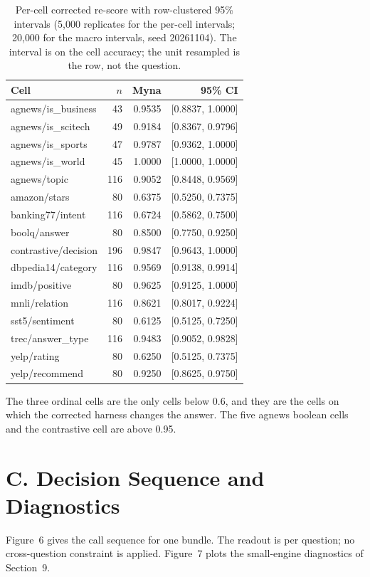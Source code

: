 \documentclass[11pt]{article}
\begin{document}
\begin{table}
\centering
\footnotesize
\caption{Per-cell corrected re-score with row-clustered 95\% intervals (5{,}000 replicates for the per-cell intervals; 20{,}000 for the macro intervals, seed
20261104). The interval is on the cell accuracy; the unit resampled is the row, not the question.}
\begin{tabular}{lrrr}
\toprule
Cell & $n$ & Myna & 95\% CI \\
\midrule
agnews/is\_business & 43 & 0.9535 & [0.8837, 1.0000] \\
agnews/is\_scitech & 49 & 0.9184 & [0.8367, 0.9796] \\
agnews/is\_sports & 47 & 0.9787 & [0.9362, 1.0000] \\
agnews/is\_world & 45 & 1.0000 & [1.0000, 1.0000] \\
agnews/topic & 116 & 0.9052 & [0.8448, 0.9569] \\
amazon/stars & 80 & 0.6375 & [0.5250, 0.7375] \\
banking77/intent & 116 & 0.6724 & [0.5862, 0.7500] \\
boolq/answer & 80 & 0.8500 & [0.7750, 0.9250] \\
contrastive/decision & 196 & 0.9847 & [0.9643, 1.0000] \\
dbpedia14/category & 116 & 0.9569 & [0.9138, 0.9914] \\
imdb/positive & 80 & 0.9625 & [0.9125, 1.0000] \\
mnli/relation & 116 & 0.8621 & [0.8017, 0.9224] \\
sst5/sentiment & 80 & 0.6125 & [0.5125, 0.7250] \\
trec/answer\_type & 116 & 0.9483 & [0.9052, 0.9828] \\
yelp/rating & 80 & 0.6250 & [0.5125, 0.7375] \\
yelp/recommend & 80 & 0.9250 & [0.8625, 0.9750] \\
\bottomrule
\end{tabular}
\end{table}

The three ordinal cells are the only cells below 0.6, and they are the cells on which the corrected
harness changes the answer. The five agnews boolean cells and the contrastive cell are above 0.95.

\section*{C. Decision Sequence and Diagnostics}
Figure~6 gives the call sequence for one bundle. The readout is per question; no
cross-question constraint is applied. Figure~7 plots the small-engine
diagnostics of Section~9.
\end{document}
